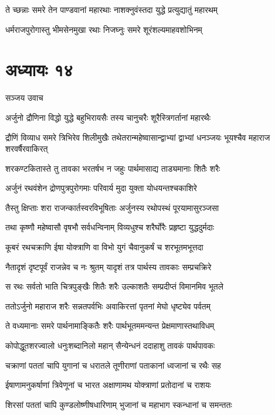 \twolineshloka
{ते च्छन्नाः समरे तेन पाण्डवानां महारथाः}
{नाशक्नुवंस्तदा युद्धे प्रत्युद्यातुं महारथम्}


\twolineshloka
{धर्मराजपुरोगास्तु भीमसेनमुखा रथाः}
{निजघ्नुः समरे शूरंशल्यमाहवशोभिनम्}


\chapter{अध्यायः १४}
\twolineshloka
{सञ्जय उवाच}
{}


\twolineshloka
{अर्जुनो द्रौणिना विद्धो युद्धे बहुभिरायसैः}
{तस्य चानुचरैः शूरैस्त्रिगर्तानां महारथैः}


\threelineshloka
{द्रौणिं विव्याध समरे त्रिभिरेव शिलीमुखैः}
{तथेतरान्महेष्वासान्द्वाभ्यां द्वाभ्यां धनञ्जयः}
{भूयश्चैव महाराज शरवर्षैरवाकिरत्}


\twolineshloka
{शरकण्टकितास्ते तु तावका भरतर्षभ}
{न जहुः पार्थमासाद्य ताड्यमानाः शितैः शरैः}


\twolineshloka
{अर्जुनं रथवंशेन द्रोणपुत्रपुरोगमाः}
{परिवार्य मुदा युक्ता योधयन्तश्चकाशिरे}


\twolineshloka
{तैस्तु क्षिप्ताः शरा राजन्कार्तस्वरविभूषिताः}
{अर्जुनस्य रथोपस्थं पूरयामासुरञ्जसा}


\twolineshloka
{तथा कृष्णौ महेष्वासौ वृषभौ सर्वधन्विनाम्}
{विव्यधुश्च शरैर्घोरैः प्रहृष्टा युद्धदुर्मदाः}


\twolineshloka
{कूबरं रथचक्राणि ईषा योक्त्राणि वा विभो}
{युगं चैवानुकर्षं च शरभूतमभूत्तदा}


\twolineshloka
{नैतादृशं दृष्टपूर्वं राजन्नेव च नः श्रुतम्}
{यादृशं तत्र पार्थस्य तावकाः सम्प्रचक्रिरे}


\twolineshloka
{स रथः सर्वतो भाति चित्रपुङ्खैः शितैः शरैः}
{उल्काशतैः सम्प्रदीप्तं विमानमिव भूतले}


\twolineshloka
{ततोऽर्जुनो महाराज शरैः सन्नतपर्वभिः}
{अवाकिरत्तां पृतनां मेघो धृष्ट्येव पर्वतम्}


\twolineshloka
{ते वध्यमानाः समरे पार्थनामाङ्कितैः शरैः}
{पार्थभूतममन्यन्त प्रेक्षमाणास्तथाविधम्}


\twolineshloka
{कोपोद्धूतशरज्वालो धनुःशब्दानिलो महान्}
{सैन्येन्धनं ददाहाशु तावकं पार्थपावकः}


\twolineshloka
{चक्राणां पततां चापि युगानां च धरातले}
{तूणीराणां पताकानां ध्वजानां च रथैः सह}


\twolineshloka
{ईषाणामनुकर्षाणां त्रिवेणूनां च भारत}
{अक्षाणामथ योक्त्राणां प्रतोदानां च राशयः}


\twolineshloka
{शिरसां पततां चापि कुण्डलोष्णीषधारिणाम्}
{भुजानां च महाभाग स्कन्धानां च समन्ततः}



